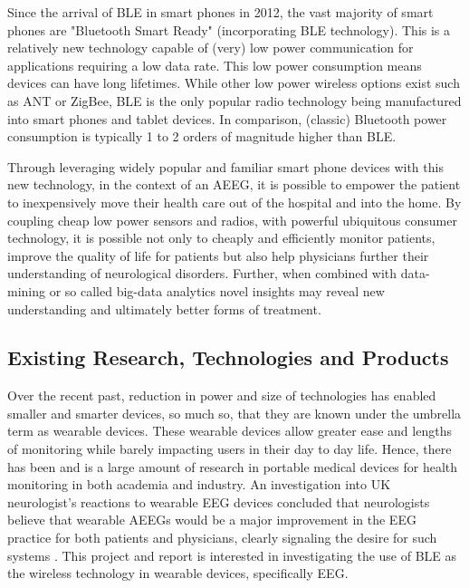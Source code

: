 \documentclass[]{article}
\begin{document}
Since the arrival of \ac{BLE} in smart phones in 2012, the vast majority of smart phones are "Bluetooth Smart Ready" (incorporating \ac{BLE} technology). This is a relatively new technology capable of (very) low power communication for applications requiring a low data rate. This low power consumption means devices can have long lifetimes. While other low power wireless options exist such as ANT or ZigBee, \ac{BLE} is the only popular radio technology being manufactured into smart phones and tablet devices. In comparison, (classic) Bluetooth power consumption is typically 1 to 2 orders of magnitude higher than \ac{BLE}.

 Through leveraging widely popular and familiar smart phone devices with this new technology, in the context of an \ac{AEEG}, it is possible to empower the patient to inexpensively move their health care out of the hospital and into the home. By coupling cheap low power sensors and radios, with powerful ubiquitous consumer technology, it is possible not only to cheaply and efficiently monitor patients, improve the quality of life for patients but also help physicians further their understanding of neurological disorders. Further, when combined with data-mining or so called big-data analytics novel insights may reveal new understanding and ultimately better forms of treatment.


\subsection{Existing Research, Technologies and Products}

Over the recent past, reduction in power and size of technologies has enabled smaller and smarter devices, so much so, that they are known under the umbrella term as wearable devices. These wearable devices allow greater ease and lengths of monitoring  while barely impacting users in their day to day life. Hence, there has been and is a large amount of research in portable medical devices for health monitoring in both academia and industry. An investigation  into UK neurologist's reactions to wearable \ac{EEG} devices concluded that neurologists believe that wearable \ac{AEEG}s would be a major improvement in the \ac{EEG} practice for both patients and physicians, clearly signaling the desire for such systems \cite{asson2008}. This project and report is interested in investigating the use of \ac{BLE} as the wireless technology in wearable devices, specifically \ac{EEG}.
\end{document}
